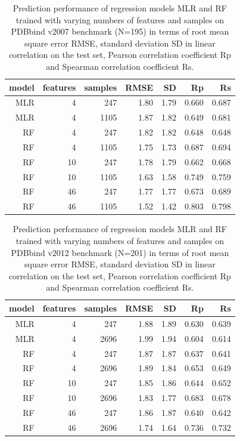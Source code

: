 \documentclass[journal=jacsat,manuscript=article]{achemso}
\begin{document}
\begin{table}
\caption{Prediction performance of regression models MLR and RF trained with varying numbers of features and samples on PDBbind v2007 benchmark (N=195) in terms of root mean square error RMSE, standard deviation SD in linear correlation on the test set, Pearson correlation coefficient Rp and Spearman correlation coefficient Rs.}
\label{tbl:tst195}
\begin{tabular}{rrrrrrr}
\hline
model & features & samples & RMSE & SD & Rp & Rs\\
\hline
MLR &  4 &  247 & 1.80 & 1.79 & 0.660 & 0.687\\
MLR &  4 & 1105 & 1.87 & 1.82 & 0.649 & 0.681\\
 RF &  4 &  247 & 1.82 & 1.82 & 0.648 & 0.648\\
 RF &  4 & 1105 & 1.75 & 1.73 & 0.687 & 0.694\\
 RF & 10 &  247 & 1.78 & 1.79 & 0.662 & 0.668\\
 RF & 10 & 1105 & 1.63 & 1.58 & 0.749 & 0.759\\
 RF & 46 &  247 & 1.77 & 1.77 & 0.673 & 0.689\\
 RF & 46 & 1105 & 1.52 & 1.42 & 0.803 & 0.798\\
\hline
\end{tabular}
\end{table}

\begin{table}
\caption{Prediction performance of regression models MLR and RF trained with varying numbers of features and samples on PDBbind v2012 benchmark (N=201) in terms of root mean square error RMSE, standard deviation SD in linear correlation on the test set, Pearson correlation coefficient Rp and Spearman correlation coefficient Rs.}
\label{tbl:tst201}
\begin{tabular}{rrrrrrr}
\hline
model & features & samples & RMSE & SD & Rp & Rs\\
\hline
MLR &  4 &  247 & 1.88 & 1.89 & 0.630 & 0.639\\
MLR &  4 & 2696 & 1.99 & 1.94 & 0.604 & 0.614\\
 RF &  4 &  247 & 1.87 & 1.87 & 0.637 & 0.641\\
 RF &  4 & 2696 & 1.89 & 1.84 & 0.653 & 0.649\\
 RF & 10 &  247 & 1.85 & 1.86 & 0.644 & 0.652\\
 RF & 10 & 2696 & 1.83 & 1.77 & 0.683 & 0.678\\
 RF & 46 &  247 & 1.86 & 1.87 & 0.640 & 0.642\\
 RF & 46 & 2696 & 1.74 & 1.64 & 0.736 & 0.732\\
\hline
\end{tabular}
\end{table}
\end{document}
